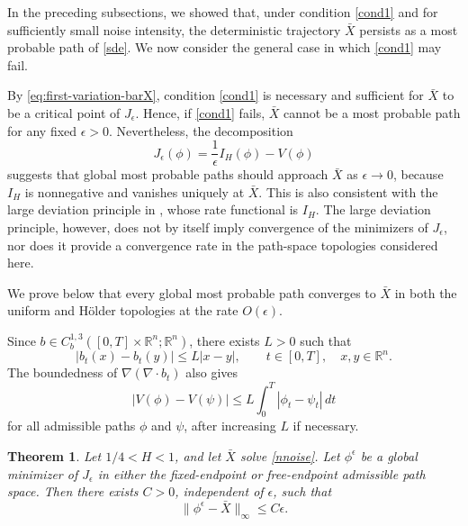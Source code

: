 \documentclass[preprint,12pt]{elsarticle}
\newtheorem{theorem}{Theorem}[section]
\theoremstyle{definition}
\theoremstyle{plain}
\begin{document}
In the preceding subsections, we showed that, under condition
\eqref{cond1} and for sufficiently small noise intensity, the
deterministic trajectory $\bar X$ persists as a most probable path of
\eqref{sde}. We now consider the general case in which \eqref{cond1}
may fail.

By \eqref{eq:first-variation-barX}, condition \eqref{cond1} is
necessary and sufficient for $\bar X$ to be a critical point of
$J_\epsilon$. Hence, if \eqref{cond1} fails, $\bar X$ cannot be a most
probable path for any fixed $\epsilon>0$. Nevertheless, the
decomposition
\begin{equation*}
    J_\epsilon(\phi)
    =
    \frac1\epsilon I_H(\phi)-V(\phi)
\end{equation*}
suggests that global most probable paths should approach $\bar X$ as
$\epsilon\to0$, because $I_H$ is nonnegative and vanishes uniquely at
$\bar X$. This is also consistent with the large deviation principle
in \cite{FanYuYuan2023}, whose rate functional is $I_H$. The large
deviation principle, however, does not by itself imply convergence of
the minimizers of $J_\epsilon$, nor does it provide a convergence rate
in the path-space topologies considered here.

We prove below that every global most probable path converges to
$\bar X$ in both the uniform and H\"older topologies at the rate
$O(\epsilon)$. 


Since
$b\in C_b^{1,3}([0,T]\times\mathbb R^n;\mathbb R^n)$, there exists
$L>0$ such that
\begin{equation}
\label{eq:global-Lipschitz-b}
    |b_t(x)-b_t(y)|
    \leq
    L|x-y|,
    \qquad
    t\in[0,T],\quad x,y\in\mathbb R^n.
\end{equation}
The boundedness of $\nabla(\nabla\!\cdot b_t)$ also gives
\begin{equation}
\label{eq:potential-Lipschitz}
    |V(\phi)-V(\psi)|
    \leq
    L\int_0^T|\phi_t-\psi_t|\,dt
\end{equation}
for all admissible paths $\phi$ and $\psi$, after increasing $L$ if
necessary.

\begin{theorem}
\label{thm:uniform-convergence-global-minimizers}
Let $1/4<H<1$, and let $\bar X$ solve \eqref{nnoise}. Let
$\phi^\epsilon$ be a global minimizer of $J_\epsilon$ in either the
fixed-endpoint or free-endpoint admissible path space. Then there
exists $C>0$, independent of $\epsilon$, such that
\begin{equation}
\label{eq:uniform-convergence-rate}
    \|\phi^\epsilon-\bar X\|_\infty
    \leq
    C\epsilon.
\end{equation}
\end{theorem}
\end{document}
